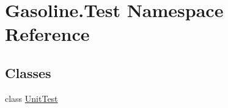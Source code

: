 \hypertarget{namespace_gasoline_1_1_test}{}\section{Gasoline.\+Test Namespace Reference}
\label{namespace_gasoline_1_1_test}
\subsection*{Classes}
\begin{DoxyCompactItemize}
\item 
class \mbox{\hyperlink{class_gasoline_1_1_test_1_1_unit_test}{Unit\+Test}}
\end{DoxyCompactItemize}
